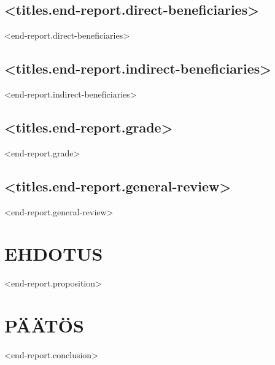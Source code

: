 \documentclass[twoside,a4paper]{article}
\begin{document}
		\subsection*{<titles.end-report.direct-beneficiaries>}
		    <end-report.direct-beneficiaries>
		
		\subsection*{<titles.end-report.indirect-beneficiaries>}
		    <end-report.indirect-beneficiaries>
		
		\subsection*{<titles.end-report.grade>}
		    <end-report.grade>
		
		\subsection*{<titles.end-report.general-review>}
		    <end-report.general-review>
		
		\newpage	
	\section{EHDOTUS}
		<end-report.proposition>
		
	\section{PÄÄTÖS}		
		<end-report.conclusion>
	
\end{document}
